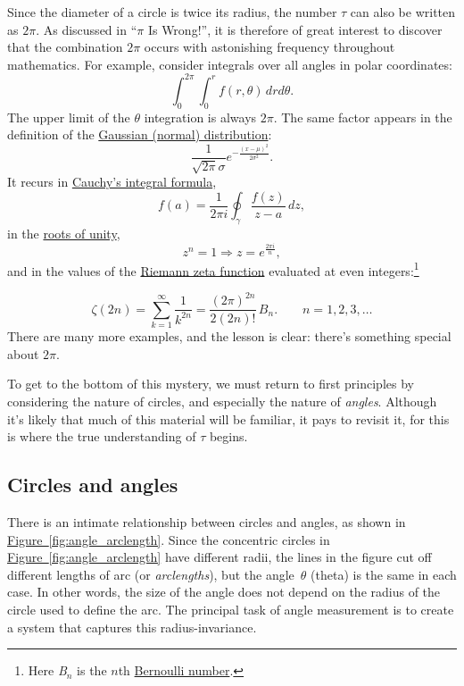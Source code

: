 \documentclass{article}
\begin{document}
Since the diameter of a circle is twice its radius, the number $\tau$ can also be written as $2\pi$. As discussed in ``$\pi$ Is Wrong!'', it is therefore of great interest to discover that the combination $2\pi$ occurs with astonishing frequency throughout mathematics. For example, consider integrals over all angles in polar coordinates:
\[
  \int_0^{2\pi}\int_0^r f(r, \theta)\, dr d\theta.
\]
The upper limit of the $\theta$ integration is always $2\pi$. The same factor appears in the definition of the \href{http://en.wikipedia.org/wiki/Normal_distribution}{Gaussian (normal) distribution}:
\[
  \frac{1}{\sqrt{2\pi}\sigma}e^{-\frac{(x-\mu)^2}{2\sigma^2}}.
\]
It recurs in \href{http://en.wikipedia.org/wiki/Cauchy's_integral_formula}{Cauchy's integral formula},
\[
  f(a) = \frac{1}{2\pi i}\oint_\gamma\frac{f(z)}{z-a}\,dz,
\]
in the \href{http://en.wikipedia.org/wiki/Root_of_unity}{roots of unity},
\[
  z^n = 1 \Rightarrow z = e^\frac{2\pi i}{n},
\]
and in the values of the \href{http://en.wikipedia.org/wiki/Riemann_zeta_function}{Riemann zeta function} evaluated at even integers:\footnote{Here \emph{B}$_n$ is the $n$th \href{http://en.wikipedia.org/wiki/Bernoulli_number}{Bernoulli number}.}

\[
  \zeta(2n) = \sum_{k=1}^\infty \frac{1}{k^{2n}} = \frac{(2\pi)^{2n}}{2(2n)!}\,B_n.\qquad n = 1, 2, 3, \ldots
\]
There are many more examples, and the lesson is clear: there's something special about $2\pi$.

To get to the bottom of this mystery, we must return to first principles by considering the nature of circles, and especially the nature of \emph{angles}. Although it's likely that much of this material will be familiar, it pays to revisit it, for this is where the true understanding of $\tau$ begins.

  \subsection{Circles and angles} %
  \label{sec:circles_and_angles}

There is an intimate relationship between circles and angles, as shown in \hyperref[fig:angle_arclength]{Figure~}\ref{fig:angle_arclength}. Since the concentric circles in \hyperref[fig:angle_arclength]{Figure~}\ref{fig:angle_arclength} have different radii, the lines in the figure cut off different lengths of arc (or \emph{arclengths}), but the angle~$\theta$ (theta) is the same in each case. In other words, the size of the angle does not depend on the radius of the circle used to define the arc. The principal task of angle measurement is to create a system that captures this radius-invariance.
\end{document}
